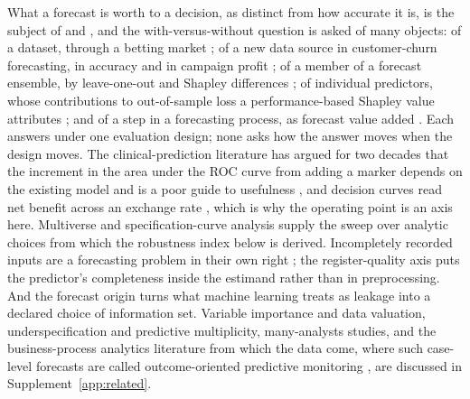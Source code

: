 What a forecast is worth to a decision, as distinct from how accurate it is,
is the subject of \citet{murphy1993good} and \citet{granger2000economic}, and
the with-versus-without question is asked of many objects: of a dataset,
through a betting market \citep{maymin2019wage}; of a new data source in
customer-churn forecasting, in accuracy and in campaign profit
\citep{decaigny2020incorporating}; of a member of a forecast ensemble, by
leave-one-out and Shapley differences \citep{kim2026beyond}; of individual
predictors, whose contributions to out-of-sample loss a performance-based
Shapley value attributes \citep{borup2022anatomy}; and of a step in a
forecasting process, as forecast value added \citep{fildes2025forecast}. Each
answers under one evaluation design; none asks how the answer moves when the
design moves. The clinical-prediction literature has argued for two decades
that the increment in the area under the ROC curve from adding a marker
depends on the existing model and is a poor guide to usefulness
\citep{pencina2008evaluating,cook2007roc,kerr2011evaluating}, and decision
curves read net benefit across an exchange rate
\citep{vickers2006dca,vickers2016net}, which is why the operating point is an
axis here. Multiverse and specification-curve analysis
\citep{steegen2016increasing,simonsohn2020specification} supply the sweep over
analytic choices from which the robustness index below is derived.
Incompletely recorded inputs are a forecasting problem in their own right
\citep{wen2024wind}; the register-quality axis puts the predictor's
completeness inside the estimand rather than in preprocessing. And the
forecast origin turns what machine learning treats as leakage
\citep{kaufman2012leakage,kapoor2023leakage} into a declared choice of
information set. Variable importance and data valuation, underspecification
and predictive multiplicity, many-analysts studies, and the business-process
analytics literature from which the data come, where such case-level
forecasts are called outcome-oriented predictive monitoring
\citep{teinemaa2019outcome}, are discussed in Supplement~\ref{app:related}.


